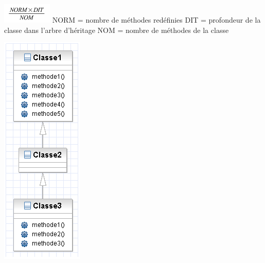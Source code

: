 \documentclass[french]{beamer}%
\begin{document}
			\begin{frame}
				\begin{center}
					\includegraphics[scale=1]{speFormule}
					\newline
					NORM = nombre de méthodes redéfinies
					\newline
					DIT = profondeur de la classe dans l'arbre d'héritage
					\newline
					NOM = nombre de méthodes de la classe
				\end{center}
			\end{frame}
		
			\begin{frame}
				\begin{center}
					\includegraphics[scale=0.4]{speGraph1}
				\end{center}
			\end{frame}
		
\end{document}

